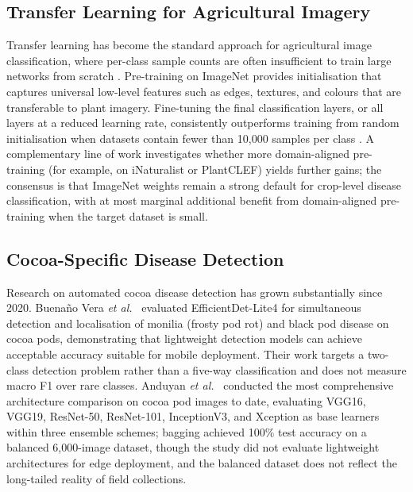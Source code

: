 \documentclass[conference,10pt]{IEEEtran}
\begin{document}
\subsection{Transfer Learning for Agricultural Imagery}

Transfer learning has become the standard approach for agricultural image
classification, where per-class sample counts are often insufficient to train
large networks from scratch \cite{transfer2024}. Pre-training on ImageNet
provides initialisation that captures universal low-level features such as
edges, textures, and colours that are transferable to plant imagery.
Fine-tuning the final classification layers, or all layers at a reduced
learning rate, consistently outperforms training from random initialisation
when datasets contain fewer than 10{,}000 samples per class \cite{anduyan2025}.
A complementary line of work investigates whether more domain-aligned
pre-training (for example, on iNaturalist or PlantCLEF) yields further gains;
the consensus is that ImageNet weights remain a strong default for crop-level
disease classification, with at most marginal additional benefit from
domain-aligned pre-training when the target dataset is small.

\subsection{Cocoa-Specific Disease Detection}

Research on automated cocoa disease detection has grown substantially since
2020. Buena\~{n}o Vera \emph{et al.}~\cite{buenano2024} evaluated
EfficientDet-Lite4 for simultaneous detection and localisation of monilia
(frosty pod rot) and black pod disease on cocoa pods, demonstrating that
lightweight detection models can achieve acceptable accuracy suitable for
mobile deployment. Their work targets a two-class detection problem rather
than a five-way classification and does not measure macro F1 over rare
classes. Anduyan \emph{et al.}~\cite{anduyan2025} conducted the most
comprehensive architecture comparison on cocoa pod images to date, evaluating
VGG16, VGG19, ResNet-50, ResNet-101, InceptionV3, and Xception as base
learners within three ensemble schemes; bagging achieved 100\% test accuracy
on a balanced 6{,}000-image dataset, though the study did not evaluate
lightweight architectures for edge deployment, and the balanced dataset does
not reflect the long-tailed reality of field collections.
\end{document}
